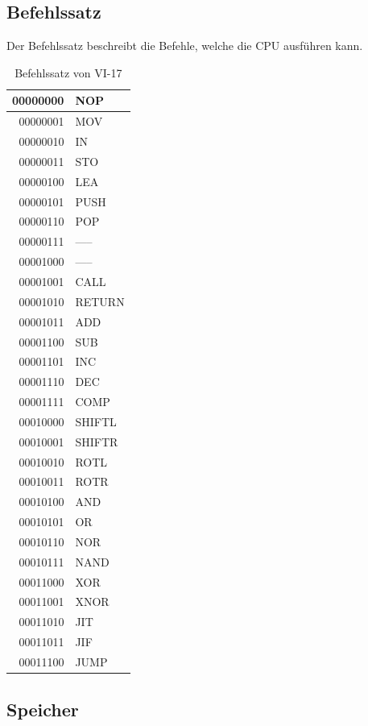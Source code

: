 \documentclass[12pt]{article}
\begin{document}
\subsection{Befehlssatz}

Der Befehlssatz beschreibt die Befehle, welche die CPU ausführen kann.
\newpage
\begin{table}[!htb]
\centering
\caption{Befehlssatz von VI-17}
\begin{tabular}{|r|l|}
  \hline
  00000000 & NOP \\
  \hline
  00000001 & MOV\\ 
  \hline
  00000010 & IN\\
  \hline
  00000011 & STO\\
  \hline
  00000100 & LEA\\
  \hline
  00000101 & PUSH \\ 
  \hline
  00000110 & POP\\
  \hline
  00000111 & -----\\
 \hline
  00001000 & ----- \\
  \hline
  00001001 & CALL\\ 
  \hline
  00001010 & RETURN\\
  \hline
  00001011 & ADD\\
  \hline 
 00001100 & SUB \\
  \hline
  00001101 & INC\\ 
  \hline
  00001110 & DEC\\
  \hline
  00001111 & COMP\\
  \hline
  00010000 & SHIFTL\\
  \hline
  00010001 & SHIFTR\\ 
  \hline
  00010010 & ROTL\\
  \hline
  00010011 & ROTR\\
  \hline
  00010100 & AND\\
  \hline
  00010101 & OR \\ 
  \hline
  00010110 & NOR\\
  \hline
  00010111 & NAND\\
  \hline
  00011000 & XOR\\
  \hline
  00011001 & XNOR \\
  \hline
  00011010 & JIT\\
  \hline
  00011011 & JIF\\
  \hline
  00011100 & JUMP\\
  \hline
\end{tabular}
\end{table}
\newpage
\subsection{Speicher}
\end{document}
